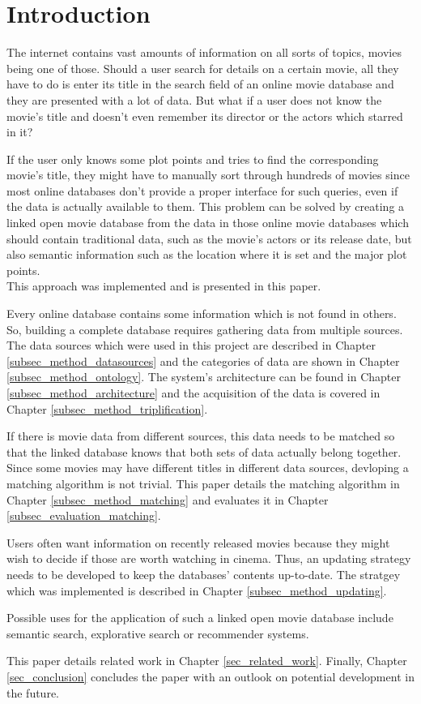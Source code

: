 \section{Introduction}
\label{sec_introduction}

The internet contains vast amounts of information on all sorts of topics, movies being one of those.
Should a user search for details on a certain movie, all they have to do is enter its title in the search field of an online movie database and they are presented with a lot of data.
But what if a user does not know the movie's title and doesn't even remember its director or the actors which starred in it?

If the user only knows some plot points and tries to find the corresponding movie's title, they might have to manually sort through hundreds of movies since most online databases don't provide a proper interface for such queries, even if the data is actually available to them.
This problem can be solved by creating a linked open movie database from the data in those online movie databases which should contain traditional data, such as the movie's actors or its release date, but also semantic information such as the location where it is set and the major plot points. \\
This approach was implemented and is presented in this paper.

Every online database contains some information which is not found in others.
So, building a complete database requires gathering data from multiple sources.
The data sources which were used in this project are described in Chapter \ref{subsec_method_datasources} and the categories of data are shown in Chapter \ref{subsec_method_ontology}.
The system's architecture can be found in Chapter \ref{subsec_method_architecture} and the acquisition of the data is covered in Chapter \ref{subsec_method_triplification}.

If there is movie data from different sources, this data needs to be matched so that the linked database knows that both sets of data actually belong together.
Since some movies may have different titles in different data sources, devloping a matching algorithm is not trivial.
This paper details the matching algorithm in Chapter \ref{subsec_method_matching} and evaluates it in Chapter \ref{subsec_evaluation_matching}.

Users often want information on recently released movies because they might wish to decide if those are worth watching in cinema.
Thus, an updating strategy needs to be developed to keep the databases' contents up-to-date.
The stratgey which was implemented is described in Chapter \ref{subsec_method_updating}.

Possible uses for the application of such a linked open movie database include semantic search, explorative search or recommender systems.

This paper details related work in Chapter \ref{sec_related_work}.
Finally, Chapter \ref{sec_conclusion} concludes the paper with an outlook on potential development in the future.